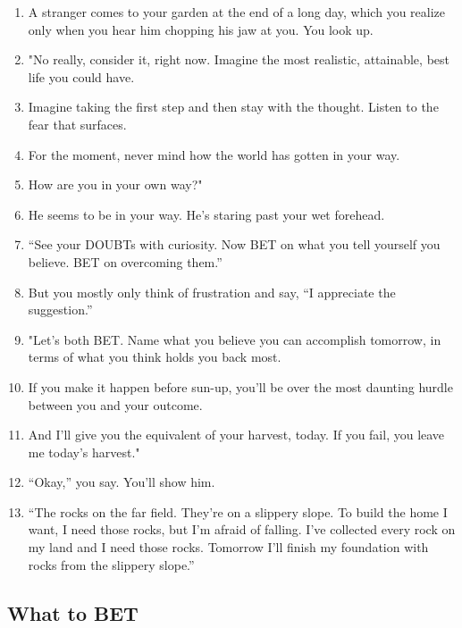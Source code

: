 \documentclass[
]{book}
\providecommand{\tightlist}{%
  \setlength{\itemsep}{0pt}\setlength{\parskip}{0pt}}
\begin{document}
\begin{enumerate}
\def\labelenumi{\arabic{enumi}.}
\setcounter{enumi}{9}
\tightlist
\item
  A stranger comes to your garden at the end of a long day, which you realize only when you hear him chopping his
  jaw at you. You look up.
\item
  "No really, consider it, right now. Imagine the most realistic,
  attainable, best life you could have.
\item
  Imagine taking the first step and then stay with the thought. Listen to
  the fear that surfaces.
\item
  For the moment, never mind how the world has gotten in your way.
\item
  How are you in your own way?"
\item
  He seems to be in your way. He's staring past your wet forehead.
\item
  ``See your DOUBTs with curiosity. Now BET on what you tell yourself
  you believe. BET on overcoming them.''
\item
  But you mostly only think of frustration and say, ``I appreciate the
  suggestion.''
\item
  "Let's both BET. Name what you believe you can accomplish
  tomorrow, in terms of what you think holds you back most.
\item
  If you make it happen before sun-up, you'll be over the most daunting
  hurdle between you and your outcome.
\item
  And I'll give you the equivalent of your harvest, today. If you fail, you
  leave me today's harvest."
\item
  ``Okay,'' you say. You'll show him.
\item
  ``The rocks on the far field. They're on a slippery slope. To build the
  home I want, I need those rocks, but I'm afraid of falling. I've collected
  every rock on my land and I need those rocks. Tomorrow I'll finish my
  foundation with rocks from the slippery slope.''
\end{enumerate}

\hypertarget{what-to-bet}{%
\subsection{What to BET}\label{what-to-bet}}
\end{document}
